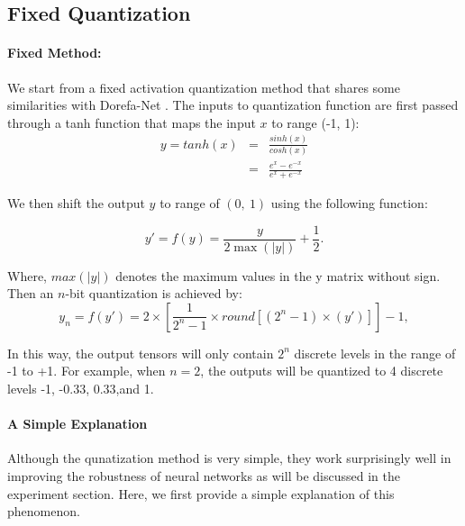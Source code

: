 \documentclass{article}
\begin{document}
\subsection{Fixed Quantization}

\paragraph{Fixed Method:}
We start from a fixed activation quantization method that shares some similarities with Dorefa-Net \cite{zhou2016dorefa}. %
The inputs to quantization function are first passed through a tanh function that maps the input $x$ to range (-1, 1):
\begin{eqnarray}
y=tanh(x)&=&\frac{sinh(x)}{cosh(x)}\\\nonumber
&=&\frac{e^x-e^{-x}}{e^x+e^{-x}}
\end{eqnarray}

\noindent We then shift the output $y$ to range of $(0,\ 1)$ using the following function:

\begin{equation}
\label{eq:f}
y'=f(y)={\frac{y}{2\max(|y|)}+\frac{1}{2}}.
\end{equation}

\noindent Where, $max(|y|)$ denotes the maximum values in the y matrix without sign. Then an $n$-bit quantization is achieved by:
\begin{equation}
\label{eq:2}
y_n=f(y')={2\times[\frac{1}{2^n-1}\times round[(2^n-1)\times(y')]]-1},
\end{equation}



\noindent In this way, the output tensors will only contain $2^n$ discrete levels in the range of -1 to +1. For example, when $n=2$, the outputs will be quantized to 4 discrete levels -1, -0.33, 0.33,and 1.




\paragraph{A Simple Explanation}
Although the qunatization method is very simple, they work surprisingly well in improving the robustness of neural networks as will be discussed in the experiment section. Here, we first provide a simple explanation of this phenomenon. 
\end{document}
